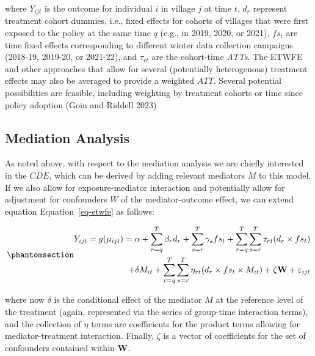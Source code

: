 \documentclass[
  letterpaper,
  DIV=11,
  numbers=noendperiod]{scrartcl}
\begin{document}
where \(Y_{ijt}\) is the outcome for individual \(i\) in village \(j\)
at time \(t\), \(d_{r}\) represent treatment cohort dummies, i.e., fixed
effects for cohorts of villages that were first exposed to the policy at
the same time \(q\) (e.g., in 2019, 2020, or 2021), \(fs_{t}\) are time
fixed effects corresponding to different winter data collection
campaigns (2018-19, 2019-20, or 2021-22), and \(\tau_{rt}\) are the
cohort-time \emph{ATTs}. The ETWFE and other approaches that allow for
several (potentially heterogenous) treatment effects may also be
averaged to provide a weighted \(ATT\). Several potential possibilities
are feasible, including weighting by treatment cohorts or time since
policy adoption (Goin and Riddell 2023)

\subsection{Mediation Analysis}\label{mediation-analysis}

As noted above, with respect to the mediation analysis we are chiefly
interested in the \(CDE\), which can be derived by adding relevant
mediators \(M\) to this model. If we also allow for exposure-mediator
interaction and potentially allow for adjustment for confounders \(W\)
of the mediator-outcome effect, we can extend equation
Equation~\ref{eq-etwfe} as follows:

\begin{equation}\phantomsection\label{eq-etwfem}{
\begin{aligned}
Y_{ijt}=g(\mu_{ijt}) = \alpha + \sum_{r=q}^{T} \beta_{r} d_{r} + \sum_{s=r}^{T} \gamma_{s} fs_{t}+ \sum_{r=q}^{T} \sum_{s=r}^{T} \tau_{rt} (d_{r} \times fs_{t}) \\ + \delta M_{it} + \sum_{r=q}^{T} \sum_{s=r}^{T} \eta_{rt} (d_{r} \times fs_{t} \times M_{it}) + \zeta \mathbf{W} + \varepsilon_{ijt}
\end{aligned}
}\end{equation}

where now \(\delta\) is the conditional effect of the mediator \(M\) at
the reference level of the treatment (again, represented via the series
of group-time interaction terms), and the collection of \(\eta\) terms
are coefficients for the product terms allowing for mediator-treatment
interaction. Finally, \(\zeta\) is a vector of coefficients for the set
of confounders contained within \(\mathbf{W}\).
\end{document}
